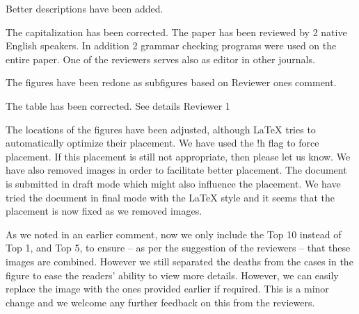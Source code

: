   { Better descriptions have been added. }


{The capitalization has been corrected. The paper has been reviewed by
  2 native English speakers. In addition 2 grammar checking programs
  were used on the entire paper. One of the reviewers serves also as
  editor in other journals.}


  { The figures have been redone as subfigures based on Reviewer ones comment. }


  {The table has been corrected. See details Reviewer 1}


  {The locations of the figures have been adjusted, although LaTeX tries to automatically optimize their
  placement. We have used the !h flag to force placement. If this
  placement is still not appropriate, then please let us know. 
   We have also
  removed images in order to facilitate better placement. The
  document is submitted in draft mode which might also influence the
  placement. We have tried the document in final mode with the LaTeX
  style and it seems that the placement is now fixed as we removed images.}


  {As we noted in an earlier comment, now we only include the
  Top 10 instead of Top 1, and Top 5, to ensure -- as per the suggestion of the
  reviewers -- that these images are combined. However we still separated
  the deaths from the cases in the figure to ease the readers' ability to view
  more details. However, we can easily replace the image with the ones
  provided earlier if required. This is a minor change and we welcome any further feedback on this from the reviewers.}



